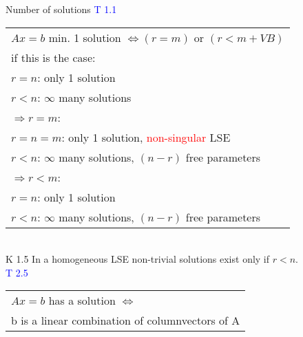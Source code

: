 \begin{mainbox}{Number of solutions}
	\textcolor{blue}{T 1.1}\\
	\begin{tabular}{l}
	$Ax = b$ min. 1 solution $\Leftrightarrow (r = m)$ or $(r < m + VB)$\\
	if this is the case:\\
		\tabitem $r = n$: only 1 solution\\
		\tabitem $r < n$: $\infty$ many solutions\\
	$\Rightarrow r = m$:\\
		\tabitem $r = n = m$: only 1 solution, \textcolor{red}{non-singular} LSE\\
		\tabitem $r < n$: $\infty$ many solutions, $(n-r)$ free parameters\\
	$\Rightarrow r < m$:\\
		\tabitem $r = n$: only 1 solution\\
		\tabitem $r < n$: $\infty$ many solutions, $(n-r)$ free parameters\\
	\end{tabular}\\
	K 1.5 In a homogeneous LSE non-trivial solutions exist only if $r < n$.
	\smallskip\\
	\textcolor{blue}{T 2.5}\\
	\begin{tabular}{l}
		$Ax = b$ has a solution $\Leftrightarrow$\\
		b is a linear combination of columnvectors of A\\
	\end{tabular}
\end{mainbox}